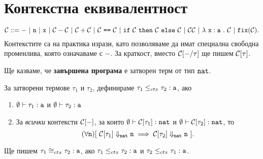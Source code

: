 \section{Контекстна еквивалентност}\label{pcf:sect:context}

\[\C ::= -\ |\ \vv{n}\ |\ \vv{x}\ |\ \C - \C\ |\ \C + \C\ |\ \C\ \vv{==}\ \C\ |\ \ifelse{\C}{\C}{\C}\ |\ \C\C\ |\ \lamb{x}{a}{\C}\ |\ \fix(\C).\]
Контекстите са на практика изрази, като позволяваме да имат специална свободна променлива, която означаваме с $-$.
За краткост, вместо $\mathcal{C}[-/\tau]$ ще пишем $\mathcal{C}[\tau]$.


Ще казваме, че {\bf завършена програма} е затворен терм от тип $\texttt{nat}$.


\begin{framed}
  \begin{definition}\label{df:context:equivalence}
    За затворени термове $\tau_1$ и $\tau_2$, дефинираме
    $\tau_1 \leq_{ctx} \tau_2 : \texttt{a}$, ако
    \begin{enumerate}[1)]
    \item
      $\emptyset \vdash \tau_1 : \texttt{a}$ и $\emptyset \vdash \tau_2 : \texttt{a}$
    \item
      За \emph{всички} контексти $\mathcal{C}[-]$, за които $\emptyset \vdash \mathcal{C}[\tau_1] : \texttt{nat}$ и $\emptyset \vdash \mathcal{C}[\tau_2] : \texttt{nat}$, то
      \[(\forall \vv{n})[\ \C[\tau_1] \Downarrow_{\nat} \vv{n} \implies \C[\tau_2] \Downarrow_{\nat} \vv{n}\ ].\]
    \end{enumerate}
    Ще пишем $\tau_1 \cong_{ctx} \tau_2 : \texttt{a}$, ако
    $\tau_1 \leq_{ctx} \tau_2 : \texttt{a}$ и $\tau_2 \leq_{ctx} \tau_1 : \texttt{a}$.
  \end{definition}
\end{framed}

